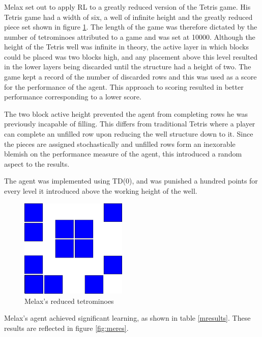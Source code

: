\documentclass{rucsthesis}
\begin{document}
\subsubsection{\cite{melaxtetris}}

Melax set out to apply RL to a greatly reduced version of the Tetris game. His Tetris game had a width of six, a well of infinite height and the greatly reduced piece set shown in figure \ref{fig:melaxpieces}. The length of the game was therefore dictated by the number of tetrominoes attributed to a game and was set at 10000. Although the height of the Tetris well was infinite in theory, the active layer in which blocks could be placed was two blocks high, and any placement above this level resulted in the lower layers being discarded until the structure had a height of two. The game kept a record of the number of discarded rows and this was used as a score for the performance of the agent. This approach to scoring resulted in better performance corresponding to a lower score. 

The two block active height prevented the agent from completing rows he was previously incapable of filling. This differs from traditional Tetris where a player can complete an unfilled row upon reducing the well structure down to it. Since the pieces are assigned stochastically and unfilled rows form an inexorable blemish on the performance measure of the agent, this introduced a random aspect to the results.

The agent was implemented using TD(0), and was punished a hundred points for every level it introduced above the working height of the well.

\begin{figure}[h]
\centering
\includegraphics[width=2in]{reducedblocks.png}
\caption{Melax's reduced tetrominoes}
\label{fig:melaxpieces}
\end{figure}

Melax's agent achieved significant learning, as shown in table \ref{mresults}. These results are reflected in figure \ref{fig:meres}.
\end{document}
